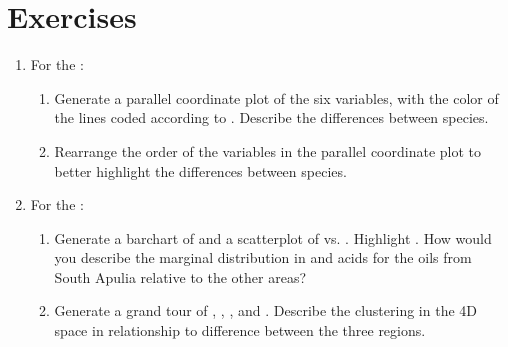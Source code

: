 \section*{Exercises}

\begin{enumerate}

\item For the :
\begin{enumerate}
\item Generate a parallel coordinate plot of the six variables, with
the color of the lines coded according to . Describe the
differences between species.
\item Rearrange the order of the variables in the parallel coordinate
plot to better highlight the differences between species. 
\end{enumerate}

\item For the :
\begin{enumerate}
\item Generate a barchart of  and a scatterplot of
 vs. . Highlight . How
would you describe the marginal distribution in  and
 acids for the oils from South Apulia relative to the other
areas?
\item Generate a grand tour of , ,
, and . Describe the clustering in the 4D
space in relationship to difference between the three regions.
\end{enumerate}


\end{enumerate}
